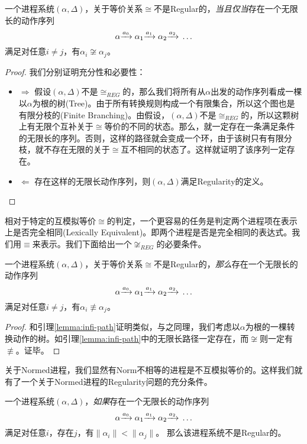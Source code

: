 \begin{lem}\label{lemma:infi-path}
一个进程系统$(\alpha,\Delta)$，关于等价关系$\cong$不是Regular的，\emph{当且仅当}存在一个无限长的动作序列
$$\alpha{\xrightarrow{a_0}{}}\alpha_1{\xrightarrow{a_1}{}}\alpha_2{\xrightarrow{a_2}{}}\ldots$$ 
满足对任意$i\neq j$，有$\alpha_i\not\cong\alpha_j$。
\end{lem}

\begin{proof}
我们分别证明充分性和必要性：
\begin{itemize}
	\item $\Rightarrow$ 假设$(\alpha,\Delta)$不是$\cong_{REG}$的，那么我们将所有从$\alpha$出发的动作序列看成一棵以$\alpha$为根的树(Tree)。由于所有转换规则构成一个有限集合，所以这个图也是有限分枝的(Finite Branching)。由假设，$(\alpha,\Delta)$不是$\cong_{REG}$的，所以这颗树上有无限个互补关于$\cong$等价的不同的状态。那么，就一定存在一条满足条件的无限长的序列。否则，这样的路径就会变成一个环，由于该树只有有限分枝，就不存在无限的关于$\cong$互不相同的状态了。这样就证明了该序列一定存在。
	\item $\Leftarrow$ 存在这样的无限长动作序列，则$(\alpha,\Delta)$满足Regularity的定义。
\end{itemize}
\end{proof}

相对于特定的互模拟等价$\cong$的判定，一个更容易的任务是判定两个进程项在表示上是否完全相同(Lexically Equivalent)。即两个进程是否是完全相同的表达式。我们用$\equiv$来表示。我们下面给出一个$\not\cong_{REG}$的必要条件。

\begin{lem}\label{lemma:infi-path-2}
一个进程系统$(\alpha,\Delta)$，关于等价关系$\cong$不是Regular的，\emph{那么}存在一个无限长的动作序列
$$\alpha{\xrightarrow{a_0}{}}\alpha_1{\xrightarrow{a_1}{}}\alpha_2{\xrightarrow{a_2}{}}\ldots$$ 
满足对任意$i\neq j$，有$\alpha_i\not\equiv\alpha_j$。
\end{lem}

\begin{proof}
和引理\ref{lemma:infi-path}证明类似，与之同理，我们考虑以$\alpha$为根的一棵转换动作的树。如引理\ref{lemma:infi-path}中的无限长路径一定存在，而$\not\cong$则一定有$\not\equiv$。证毕。
\end{proof}

关于Normed进程，我们显然有Norm不相等的进程是不互模拟等价的。这样我们就有了一个关于Normed进程的Regularity问题的充分条件。

\begin{lem}\label{lemma:infi-path-3}
一个进程系统$(\alpha,\Delta)$，\emph{如果}存在一个无限长的动作序列
$$\alpha{\xrightarrow{a_0}{}}\alpha_1{\xrightarrow{a_1}{}}\alpha_2{\xrightarrow{a_2}{}}\ldots$$ 
满足对任意$i$，存在$j$，有$\|\alpha_i\|<\|\alpha_j\|$。
那么该进程系统不是Regular的。
\end{lem}


